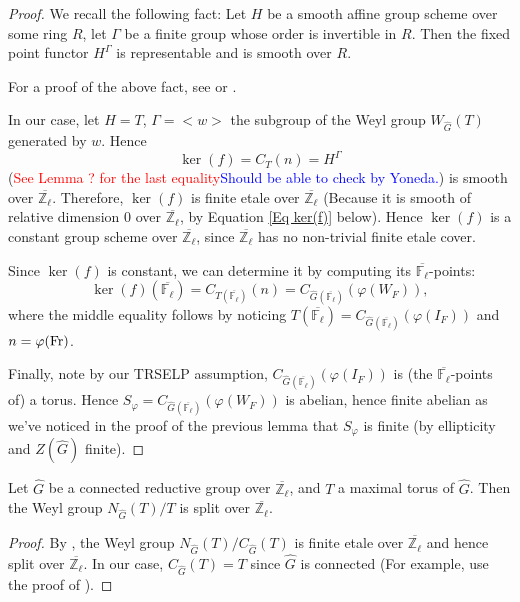 \begin{proof}
	We recall the following fact: Let $H$ be a smooth affine group scheme over some ring $R$, let $\Gamma$ be a finite group whose order is invertible in $R$. Then the fixed point functor $H^{\Gamma}$ is representable and is smooth over $R$.
	
	For a proof of the above fact, see \cite[Proposition 3.4]{edixhoven1992neron} or \cite[Lemma A.1, A.13]{dhkm2020moduli}.
	
	In our case, let $H=T$, $\Gamma=<w>$ the subgroup of the Weyl group $W_{\hat{G}}(T)$ generated by $w$. Hence $$\ker(f)=C_T(n)=H^{\Gamma}$$
	(\textcolor{red}{See Lemma ? for the last equality}\textcolor{blue}{Should be able to check by Yoneda.}) is smooth over $\overline{\mathbb{Z}_{\ell}}$. Therefore, $\ker(f)$ is finite etale over $\overline{\mathbb{Z}_{\ell}}$ (Because it is smooth of relative dimension $0$ over $\overline{\mathbb{Z}_{\ell}}$, by Equation \eqref{Eq ker(f)} below). Hence $\ker(f)$ is a constant group scheme over $\overline{\mathbb{Z}_{\ell}}$, since $\overline{\mathbb{Z}_{\ell}}$ has no non-trivial finite etale cover.
	
	Since $\ker(f)$ is constant, we can determine it by computing its $\overline{\mathbb{F}_{\ell}}$-points:
	\begin{equation}\label{Eq ker(f)}
	\ker(f)(\overline{\mathbb{F}_{\ell}})=C_{T(\overline{\mathbb{F}_{\ell}})}(n)=C_{\hat{G}(\overline{\mathbb{F}_{\ell}})}(\varphi(W_F)),
	\end{equation}
	where the middle equality follows by noticing $T(\overline{\mathbb{F}_{\ell}})=C_{\hat{G}(\overline{\mathbb{F}_{\ell}})}(\varphi(I_F))$ and $n=\varphi(\operatorname{Fr})$.
	
	Finally, note by our TRSELP assumption, $C_{\hat{G}(\overline{\mathbb{F}_{\ell}})}(\varphi(I_F))$ is (the $\overline{\mathbb{F}_{\ell}}$-points of) a torus. Hence $S_{\varphi}=C_{\hat{G}(\overline{\mathbb{F}_{\ell}})}(\varphi(W_F))$ is abelian, hence finite abelian as we've noticed in the proof of the previous lemma that $S_\varphi$ is finite (by ellipticity and $Z(\hat{G})$ finite).
\end{proof}

\begin{lemma}\label{Lem Wely}
	Let $\hat{G}$ be a connected reductive group over $\overline{\mathbb{Z}_{\ell}}$, and $T$ a maximal torus of $\hat{G}$. Then the Weyl group $N_{\hat{G}}(T)/T$ is split over $\overline{\mathbb{Z}_{\ell}}$.
\end{lemma}

\begin{proof}
	By \cite[Proposition 3.2.8]{conrad2014reductive}, the Weyl group $N_{\hat{G}}(T)/C_{\hat{G}}(T)$ is finite etale over $\overline{\mathbb{Z}_{\ell}}$ and hence split over $\overline{\mathbb{Z}_{\ell}}$. In our case, $C_{\hat{G}}(T)=T$ since $\hat{G}$ is connected (For example, use the proof of \cite[Theorem 3.1.12]{conrad2014reductive}).
\end{proof}
	

